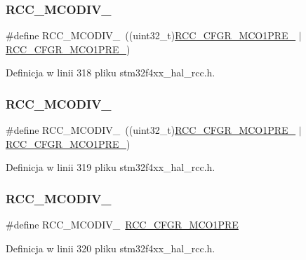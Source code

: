 \subsubsection{\texorpdfstring{R\+C\+C\+\_\+\+M\+C\+O\+D\+I\+V\+\_}{RCC\_MCODIV\_3}}
{\footnotesize\ttfamily \#define R\+C\+C\+\_\+\+M\+C\+O\+D\+I\+V\+\_~((uint32\+\_\+t)\hyperlink{group___peripheral___registers___bits___definition_gac8007a9d6ee3fd88912aaf290746ae0e}{R\+C\+C\+\_\+\+C\+F\+G\+R\+\_\+\+M\+C\+O1\+P\+R\+E\+\_} $\vert$ \hyperlink{group___peripheral___registers___bits___definition_ga11e1d10d1b55e0d88d24212ea2c8ba6e}{R\+C\+C\+\_\+\+C\+F\+G\+R\+\_\+\+M\+C\+O1\+P\+R\+E\+\_})}



Definicja w linii 318 pliku stm32f4xx\+\_\+hal\+\_\+rcc.\+h.

\mbox{\label{group___r_c_c___m_c_ox___clock___prescaler_ga1bdc2eb56aaeb53dc3ca5cd72f22d4c8}} 
\subsubsection{\texorpdfstring{R\+C\+C\+\_\+\+M\+C\+O\+D\+I\+V\+\_}{RCC\_MCODIV\_4}}
{\footnotesize\ttfamily \#define R\+C\+C\+\_\+\+M\+C\+O\+D\+I\+V\+\_~((uint32\+\_\+t)\hyperlink{group___peripheral___registers___bits___definition_gaaf7c1280f61d56b4897f9c876987e092}{R\+C\+C\+\_\+\+C\+F\+G\+R\+\_\+\+M\+C\+O1\+P\+R\+E\+\_} $\vert$ \hyperlink{group___peripheral___registers___bits___definition_ga11e1d10d1b55e0d88d24212ea2c8ba6e}{R\+C\+C\+\_\+\+C\+F\+G\+R\+\_\+\+M\+C\+O1\+P\+R\+E\+\_})}



Definicja w linii 319 pliku stm32f4xx\+\_\+hal\+\_\+rcc.\+h.

\mbox{\label{group___r_c_c___m_c_ox___clock___prescaler_ga67292dd05ceb8189ec439d4ac4d58b88}} 
\subsubsection{\texorpdfstring{R\+C\+C\+\_\+\+M\+C\+O\+D\+I\+V\+\_}{RCC\_MCODIV\_5}}
{\footnotesize\ttfamily \#define R\+C\+C\+\_\+\+M\+C\+O\+D\+I\+V\+\_~\hyperlink{group___peripheral___registers___bits___definition_ga23171ca70972a106109a6e0804385ec5}{R\+C\+C\+\_\+\+C\+F\+G\+R\+\_\+\+M\+C\+O1\+P\+RE}}



Definicja w linii 320 pliku stm32f4xx\+\_\+hal\+\_\+rcc.\+h.

